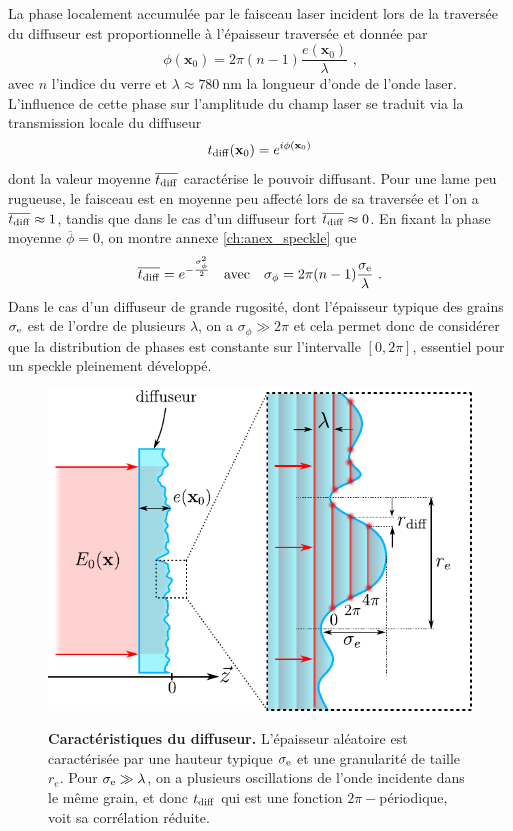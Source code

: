 La phase localement accumulée par le faisceau laser incident lors de la traversée du diffuseur est proportionnelle à l'épaisseur traversée et donnée par
\begin{equation}
\phi(\mathbf{x}_0)=2\pi (n-1) \frac{e(\mathbf{x}_0)}{\lambda} \text{ ,}
\end{equation}
avec $n$ l'indice du verre et $\lambda\approx \SI{780}{\nano\metre}$ la longueur d'onde de l'onde laser. L'influence de cette phase sur l'amplitude du champ laser se traduit via la transmission locale du diffuseur
\begin{equation}
t_{\mathrm{diff}}(\mathbf{x}_0)=e^{i\phi(\mathbf{x}_0)}
\end{equation}
dont la valeur moyenne $\overline{t_{\mathrm{diff}}}$ caractérise le pouvoir diffusant. Pour une lame peu rugueuse, le faisceau est en moyenne peu affecté lors de sa traversée et l'on a $\overline{t_{\mathrm{diff}}}\approx 1$, tandis que dans le cas d'un diffuseur fort $\overline{t_{\mathrm{diff}}} \approx 0$. En fixant la phase moyenne $\overline{\phi}=0$, on montre annexe \ref{ch:anex_speckle} que \citep{denechaud2018vers}
\begin{equation}
\overline{t_{\mathrm{diff}}}=e^{-\frac{\sigma_{\phi}^2}{2}} \quad \text{avec} \quad \sigma_\phi=2\pi (n-1) \frac{\sigma_{\mathrm{e}}}{\lambda} \text{ .}
\end{equation}
Dans le cas d'un diffuseur de grande rugosité, dont l'épaisseur typique des grains $\sigma_{\mathrm{e}}$ est de l'ordre de plusieurs $\lambda$, on a $\sigma_\phi \gg 2\pi$ et cela permet donc de considérer que la distribution de phases est constante sur l'intervalle $\left[0,2\pi \right]$, essentiel pour un speckle pleinement développé.

\begin{figure}
\centering
\includegraphics[scale=1]{Fig/Speckle/diffus_prop.pdf}
\label{fig:diffus_prop}
\caption{\textbf{Caractéristiques du diffuseur.} L'épaisseur aléatoire est caractérisée par une hauteur typique $\sigma_{\mathrm{e}}$ et une granularité de taille $r_e$. Pour $\sigma_{\mathrm{e}} \gg \lambda$, on a plusieurs oscillations de l'onde incidente dans le même grain, et donc $t_{\mathrm{diff}}$ qui est une fonction $2\pi-$périodique, voit sa corrélation réduite.}
\end{figure}


